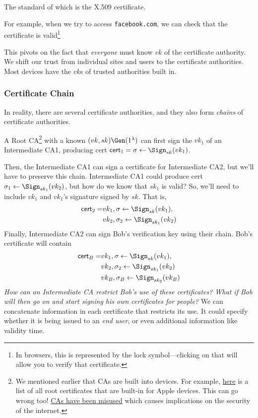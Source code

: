 
The standard of which is the X.509 certificate.

For example, when we try to access \texttt{facebook.com}, we can check that the certificate is valid\footnote{In browsers, this is represented by the lock symbol---clicking on that will allow you to verify that certificate.}


This pivots on the fact that \emph{everyone} must know $vk$ of the certificate authority. We shift our trust from individual sites and users to the certificate authorities. Most devices have the $vk$s of trusted authorities built in.

\subsubsection{Certificate Chain}
In reality, there are several certificate authorities, and they also form \emph{chains} of certificate authorities.


A Root CA\footnote{We mentioned earlier that CAs are built into devices. For example, \href{https://support.apple.com/en-us/HT213464}{here} is a list of all root certificates that are built-in for Apple devices. This can go wrong too! \href{https://en.wikipedia.org/wiki/Root_certificate\#Incidents_of_root_certificate_misuse}{CAs have been misused} which causes implications on the security of the internet.} with a known $(vk, sk)\Gen(1^\lambda)$ can first sign the $vk_1$ of an Intermediate CA1, producing cert $\mathsf{cert}_1 = \sigma \leftarrow \Sign_{sk}(vk_1)$.

Then, the Intermediate CA1 can sign a certificate for Intermediate CA2, but we'll have to preserve this chain. Intermediate CA1 could produce cert $\sigma_1\leftarrow\Sign_{sk_1}(vk_2)$, but how do we know that $sk_1$ is valid? So, we'll need to include $vk_1$ and $vk_1$'s signature signed by $sk$. That is,
\begin{align*}
    \mathsf{cert}_2 = & vk_1, \sigma \leftarrow \Sign_{sk}(vk_1),   \\
                      & vk_2, \sigma_2\leftarrow \Sign_{sk_1}(vk_2)
\end{align*}
Finally, Intermediate CA2 can sign Bob's verification key using their chain. Bob's certificate will contain
\begin{align*}
    \mathsf{cert}_B = & vk_1, \sigma \leftarrow \Sign_{sk}(vk_1),   \\
                      & vk_2, \sigma_2\leftarrow \Sign_{sk_1}(vk_2) \\
                      & vk_B, \sigma_B\leftarrow \Sign_{sk_2}(vk_B)
\end{align*}
\emph{How can an Intermediate CA restrict Bob's use of these certificates? What if Bob will then go on and start signing his own certificates for people?} We can concatenate information in each certificate that restricts its use. It could specify whether it is being issued to an \emph{end user}, or even additional information like validity time.

